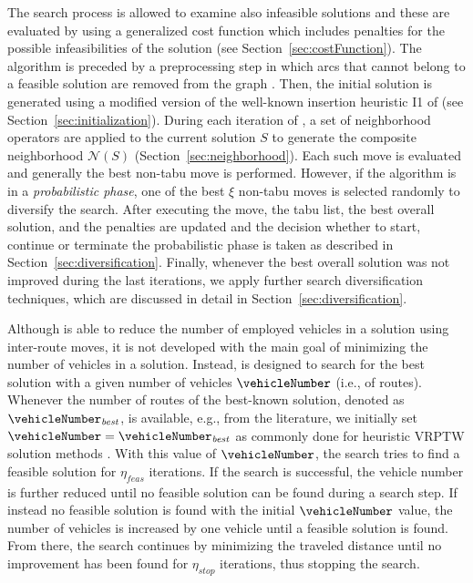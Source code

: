 \documentclass[11pt,a4paper,fleqn]{article}
\begin{document}
The search process is allowed to examine also infeasible solutions and these are evaluated by using a generalized cost function which includes penalties for the possible infeasibilities of the solution (see Section~\ref{sec:costFunction}).  
%
The algorithm is preceded by a preprocessing step %
in which arcs that cannot belong to a feasible solution  are removed from the graph \citep[see, e.g.,][]{psaraftis:83,savelsbergh:85,savelsbergh:90}. Then, 
the initial solution is generated using a modified version of the well-known insertion heuristic I1 of \citet{solomon:87} (see Section~\ref{sec:initialization}).
During each iteration of \tsnew, a set of neighborhood operators are applied to the current solution $S$ to generate the composite neighborhood $\mathcal{N}(S)$ (Section~\ref{sec:neighborhood}). Each such move is evaluated and generally the best non-tabu move is performed. However, if the algorithm is in a \emph{probabilistic phase}, one of the best $\xi$ non-tabu moves is selected randomly to diversify the search. After executing the move, the tabu list, the best overall solution, and the penalties are updated and the decision whether to start, continue or terminate the probabilistic phase is taken as described in Section~\ref{sec:diversification}. Finally, whenever  the best overall solution was not improved during the last iterations, we apply further search diversification techniques, which are discussed in detail in Section~\ref{sec:diversification}.

Although \tsnew is able to reduce the number of employed vehicles in a solution using inter-route moves, it is not developed with the main goal of minimizing the number of vehicles in a solution. Instead, \tsnew is designed to search for the best solution with a given number of vehicles $\vehicleNumber$ (i.e., of routes). Whenever the number of routes of the best-known solution, denoted as $\vehicleNumber_{\mathit{best}}$, is available, e.g., from the literature, we initially set  $\vehicleNumber = \vehicleNumber_{\mathit{best}}$ as commonly done for heuristic VRPTW solution methods \citep[see, e.g.,][]{cordeau:01,czech:02,ibaraki:08}. With this value of $\vehicleNumber$, the search tries to find a feasible solution for $\eta_{\mathit{feas}}$ iterations.  If the search is successful, the vehicle number is further reduced until no feasible solution can be found during a search step. If instead no feasible solution is found with the initial $\vehicleNumber$ value, the number of vehicles is increased by one vehicle until a feasible solution is found. From there, the search continues by minimizing the traveled distance until no improvement has been found for  $\eta_{\mathit{stop}}$ iterations, thus stopping the search.
\end{document}

